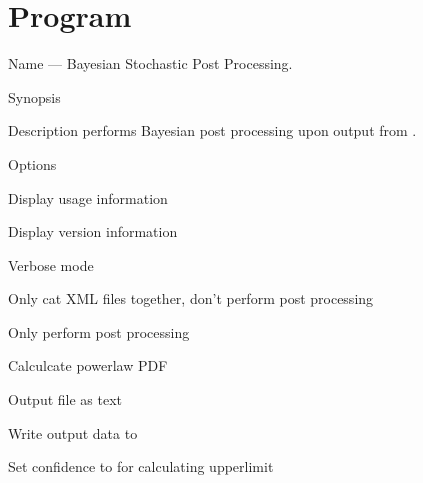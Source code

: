 
\section{Program }
\label{program:lalapps-stopp-bayes}

\begin{entry}
\item[Name]
 --- Bayesian Stochastic Post Processing.

\item[Synopsis]
  \newline \hspace*{0.5in}
 \newline \hspace*{0.5in}
 \newline \hspace*{0.5in}
 \newline \hspace*{0.5in}
 \newline \hspace*{0.5in}
 \newline \hspace*{0.5in}
 \newline \hspace*{0.5in}
 \newline \hspace*{0.5in}
  \newline \hspace*{0.5in}
 

\item[Description]
 performs Bayesian post processing upon output
from .

\item[Options]\leavevmode
\begin{entry}
\item[\option{--help}]
Display usage information
\item[\option{--version}]
Display version information
\item[\option{--verbose}]
Verbose mode
\item[\option{--cat-only}]
Only cat XML files together, don't perform post processing
\item[\option{--analyse-only}]
Only perform post processing
\item[\option{--powerlaw-pdf}]
Calculcate powerlaw PDF
\item[\option{--text}]
Output file as text
\item[\option{--output} \parm{FILE}]
Write output data to 
\item[\option{--confidence} \parm{LEVEL}]
Set confidence to  for calculating upperlimit
\end{entry}


\end{entry}

